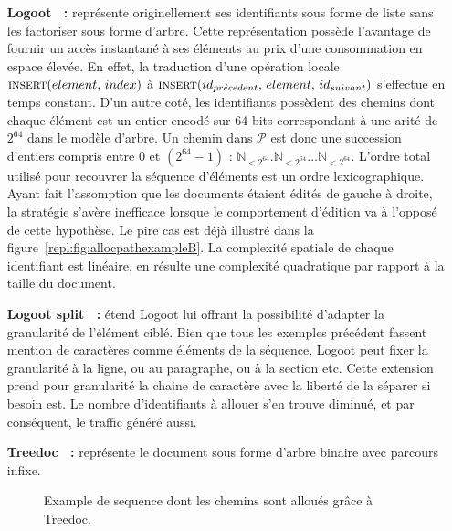 \begin{itemize}
\item [\textbf{Logoot~\cite{weiss2010collaborative, weiss2009logoot,
      weiss2010logootundo} :}] représente originellement ses identifiants sous
  forme de liste sans les factoriser sous forme d'arbre. Cette représentation
  possède l'avantage de fournir un accès instantané à ses éléments au prix d'une
  consommation en espace élevée. En effet, la traduction d'une opération locale
  $\textsc{insert}(element,\, index)$ à
  $\textsc{insert}(id_{pr\acute{e}cedent},\, element,\, id_{suivant})$
  s'effectue en temps constant. D'un autre coté, les identifiants possèdent des
  chemins dont chaque élément est un entier encodé sur 64 bits correspondant à
  une arité de $2^{64}$ dans le modèle d'arbre. Un chemin dans $\mathcal{P}$ est
  donc une succession d'entiers compris entre 0 et $(2^{64}-1)$ :
  $\mathbb{N}_{<2^{64}}.\mathbb{N}_{<2^{64}}\ldots\mathbb{N}_{<2^{64}}$.
  L'ordre total utilisé pour recouvrer la séquence d'éléments est un ordre
  lexicographique. Ayant fait l'assomption que les documents étaient édités de
  gauche à droite, la stratégie s'avère inefficace lorsque le comportement
  d'édition va à l'opposé de cette hypothèse. Le pire cas est déjà illustré dans
  la figure~\ref{repl:fig:allocpathexampleB}. La complexité spatiale de chaque
  identifiant est linéaire, en résulte une complexité quadratique par rapport à
  la taille du document.
\item [\textbf{Logoot split~\cite{mehdi2014merging} :}] étend Logoot lui offrant
  la possibilité d'adapter la granularité de l'élément ciblé. Bien que tous les
  exemples précédent fassent mention de caractères comme éléments de la
  séquence, Logoot peut fixer la granularité à la ligne, ou au paragraphe, ou à
  la section etc. Cette extension prend pour granularité la chaine de caractère
  avec la liberté de la séparer si besoin est. Le nombre d'identifiants à
  allouer s'en trouve diminué, et par conséquent, le traffic généré aussi.
\item [\textbf{Treedoc~\cite{letia2009crdts, preguica2009commutative} :}]
  représente le document sous forme d'arbre binaire avec parcours infixe.
  
  \begin{figure*}
    \begin{center}
      
      \caption{\label{repl:fig:treedocexample}Example de sequence dont les
        chemins sont alloués grâce à Treedoc.}
    \end{center}
  \end{figure*}


\end{itemize}
